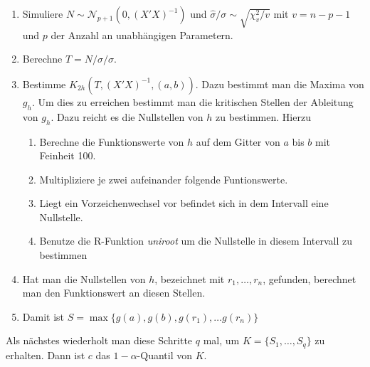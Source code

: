 \documentclass[12pt,a4paper]{article}
\theoremstyle{definition}
\theoremstyle{definition}
\theoremstyle{definition}
\theoremstyle{definition}
\newcommand{\ngridpoly}{100}
\begin{document}
\begin{enumerate}
\item Simuliere $N \sim \mathscr{N}_{p+1}(0,(X'X)^{-1})$ und $\hat{\sigma}/\sigma \sim \sqrt{\chi^2_v /v}$ mit $v=n-p-1$ und $p$ der Anzahl an unabhängigen Parametern.
\item Berechne $T=N/\hat{\sigma}/\sigma$.
\item Bestimme $K_{2h}(T,(X'X)^{-1},(a,b))$. Dazu bestimmt man die Maxima von $g_h$. Um dies zu erreichen bestimmt man die kritischen Stellen der Ableitung von $g_h$. Dazu reicht es die Nullstellen von $h$ zu bestimmen. Hierzu
\begin{enumerate}
\item Berechne die Funktionswerte von $h$ auf dem Gitter von $a$ bis $b$ mit Feinheit \ngridpoly .
\item Multipliziere je zwei aufeinander folgende Funtionswerte.
\item Liegt ein Vorzeichenwechsel vor befindet sich in dem Intervall eine Nullstelle.
\item Benutze die R-Funktion \textit{uniroot} um die Nullstelle in diesem Intervall zu bestimmen
\end{enumerate}
\item Hat man die Nullstellen von $h$, bezeichnet mit $r_1, \ldots, r_n$, gefunden, berechnet man den Funktionswert an diesen Stellen.
\item Damit ist $S = \max\{ g(a), g(b), g(r_1), \ldots g(r_n) \}$
\end{enumerate}

Als nächstes wiederholt man diese Schritte $q$ mal, um $K= \{S_1, \ldots, S_q\}$ zu erhalten. Dann ist $c$ das $1-\alpha$-Quantil von $K$.
\end{document}

